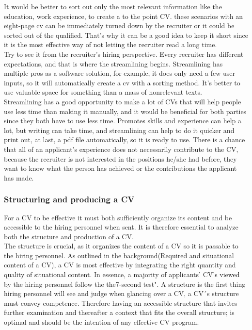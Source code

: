 It would be better to sort out only the most relevant information like the education, work experience, to create a to the point CV. 
these scenarios with an eight-page cv can be immediately turned down by the recruiter or it could be sorted out of the qualified.
That's why it can be a good idea to keep it short since it is the most effective way of not letting the recruiter read a long time. \\

Try to see it from the recruiter's hiring perspective. Every recruiter has different expectations, 
and that is where the streamlining begins. Streamlining has multiple pros as a software solution,
for example, it does only need a few user inputs, so it will automatically create a cv with a sorting method. 
It's better to use valuable space for something than a mass of nonrelevant texts. \\

Streamlining has a good opportunity to make a lot of CVs that will help people use less time than making it manually,
and it would be beneficial for both parties since they both have to use less time.
Promotes skills and experience can help a lot, but writing can take time, and streamlining can help to do it quicker 
and print out, at last, a pdf file automatically, so it is ready to use.
There is a chance that all of an applicant's experience does not necessarily contribute to the CV, 
because the recruiter is not interested in the positions he/she had before, they want to know what the person has achieved
or the contributions the applicant has made. 

\subsubsection{Structuring and producing a CV}
For a CV to be effective it must both sufficiently organize its content and be accessible to the hiring personnel when sent.
It is therefore essential to analyze both the structure and production of a CV. \\

The structure is crucial, as it organizes the content of a CV so it is passable to the hiring personnel.
As outlined in the background(Required and situational content of a CV), a CV is most effective by integrating the right quantity and quality of situational content.
In essence, a majority of applicants' CV's viewed by the hiring personnel follow the the7-second test".
A structure is the first thing hiring personnel will see and judge when glancing over a CV, a CV´s structure must convey competence.
Therefore having an accessible structure that invites further examination and thereafter a context that fits the overall structure;
is optimal and should be the intention of any effective CV program. \\


